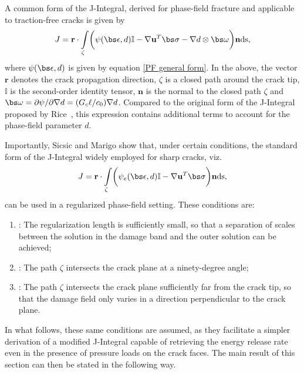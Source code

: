 A common form of the J-Integral, derived for phase-field fracture and applicable to traction-free cracks is given by \cite{sicsic2013gradient,ballarini2016closed} 
\begin{equation}
    J = \textbf{r} \cdot \int\limits_{\zeta} \biggl( \psi(\bs\epsilon, d)\mathbb{I} - \nabla \textbf{u}^T\bs \sigma-\nabla d \otimes \bs\omega \biggr) \textbf{n}\text{ds}, 
\end{equation}
where $\psi(\bs\epsilon, d)$ is given by equation \eqref{PF general form}. In the above, the vector $\textbf{r}$ denotes the crack propagation direction, $\zeta$ is a closed path around the crack tip, $\mathbb{I}$ is the second-order identity tensor, $\textbf{n}$ is the normal to the closed path $\zeta$ and $\bs\omega = \partial \psi/\partial \nabla d = (G_c\ell/c_0)\nabla d$. Compared to the original form of the J-Integral proposed by Rice~\cite{rice1968mathematical,rice1968path}, this expression contains additional terms to account for the phase-field parameter $d$. 

Importantly,  Sicsic and Marigo \cite{sicsic2013gradient} show that, under certain conditions, the standard form of the J-Integral widely employed for sharp cracks, viz.
\begin{equation}
    J = \textbf{r} \cdot \int\limits_{\zeta} \biggl( \psi_e(\bs\epsilon, d)\mathbb{I} - \nabla \textbf{u}^T\bs \sigma\biggr) \textbf{n}\text{ds},
\end{equation}
 can be used in a regularized phase-field setting. These conditions are:

\begin{enumerate}[start=1,label={\bfseries H\arabic*}]
    \item \label{itm:hyp1}: The regularization length is sufficiently small, so that a separation of scales between the solution in the damage band and the outer solution can be achieved;

    \item \label{itm:hyp2}: The path $\zeta$ intersects the crack plane at a ninety-degree angle;

    \item \label{itm:hyp3}: The path $\zeta$ intersects the crack plane sufficiently far from the crack tip, so that the damage field only varies in a direction perpendicular to the crack plane.   
\end{enumerate}

\noindent In what follows, these same conditions are assumed, as they facilitate a simpler derivation of a modified J-Integral capable of retrieving the energy release rate even in the presence of pressure loads on the crack faces. The main result of this section can then be stated in the following way.

